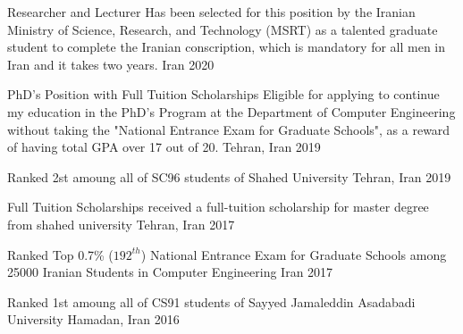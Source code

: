 


\begin{cvhonors}

  \cvhonor
    {Researcher and Lecturer} %
    {Has been selected for this position by the Iranian Ministry of Science, Research, and Technology (MSRT) as a talented graduate student to complete the Iranian conscription, which is mandatory for all men in Iran and it takes two years.} %
    {Iran} %
    {2020} %
    
  \cvhonor
    {PhD's Position with Full Tuition Scholarships} %
    {Eligible for applying to continue my education in the PhD's Program at the
    Department of Computer Engineering without
    taking the "National Entrance Exam for Graduate Schools", as a reward of having
    total GPA over 17 out of 20.} %
    {Tehran, Iran} %
    {2019} %
    
  \cvhonor
    {Ranked 2st} %
    {amoung all of SC96 students of Shahed University} %
    {Tehran, Iran} %
    {2019} %

  \cvhonor
    {Full Tuition Scholarships} %
    {received a full-tuition scholarship for master degree from shahed university} %
    {Tehran, Iran} %
    {2017} %
    
  \cvhonor
    {Ranked Top 0.7\% ($192^{th}$)} %
    {National Entrance Exam for Graduate Schools among 25000 Iranian Students in Computer Engineering} %
    {Iran} %
    {2017} %
    
  \cvhonor
    {Ranked 1st} %
    {amoung all of CS91 students of Sayyed Jamaleddin Asadabadi University} %
    {Hamadan, Iran} %
    {2016} %
    

\end{cvhonors}
